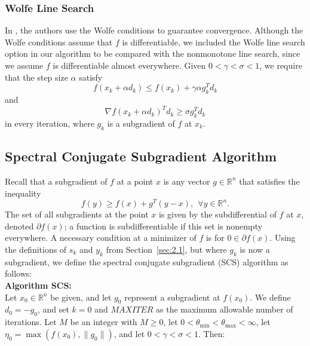 \documentclass[]{interact}
\newcommand{\Real}{\mathbb{R}}
\theoremstyle{plain}%
\theoremstyle{definition}
\theoremstyle{remark}
\begin{document}
\subsubsection{Wolfe Line Search}
\label{sec:2.22}
In \cite{Bm01}, the authors use the Wolfe conditions to guarantee convergence.  Although the Wolfe conditions assume that $f$ is differentiable, we included the Wolfe line search option in our algorithm to be compared with the nonmonotone line search, since we assume $f$ is differentiable almost everywhere. Given $0<\gamma<\sigma<1$, we require that the step size $\alpha$ satisfy
\begin{equation}\label{glb2}
f(x_k + \alpha d_k) \leq f(x_k) + \gamma \alpha g_k^Td_k
\end{equation}
and
\begin{equation}
\label{glb3}
\nabla f(x_k +\alpha d_k)^Td_k\geq \sigma g_k^Td_k
\end{equation}
in every iteration, where $g_k$ is a subgradient of $f$ at $x_k$.

\subsection{Spectral Conjugate Subgradient Algorithm}
\label{sec:2.3}

Recall that a subgradient of $f$ at a point $x$ is any vector $g \in \Real^n$ that satisfies the inequality 
\begin{equation*}f(y)\geq f(x) +g^T(y-x) ,~~\forall y \in \Real^n. 
\end{equation*}
The set of all subgradients at the point $x$ is given by the subdifferential of $f$ at $x$, denoted $\partial f (x)$; a function is subdifferentiable if this set is nonempty everywhere. A necessary condition at a minimizer of $f$ is for $0 \in \partial f(x)$. Using the definitions of $s_k$ and $y_k$ from Section~\ref{sec:2.1}, but where $g_k$ is now a subgradient, we define the spectral conjugate subgradient (SCS) algorithm as follows:\\

\noindent
{\bf Algorithm SCS:}\\
\noindent
{Let $x_0\in \Real^n$ be given, and let $g_0$ represent a subgradient at $f(x_0)$. We define $d_0=-g_0$, and set $k=0$ and $MAXITER$ as the maximum allowable number of iterations. Let $M$ be an integer with $M \geq 0$, let $0<\theta_{\min}<\theta_{\max}<\infty$, let $\eta_{0}=\max(f(x_0),\parallel g_0\parallel)$, and let $0<\gamma<\sigma<1$. Then:}\\
\end{document}
